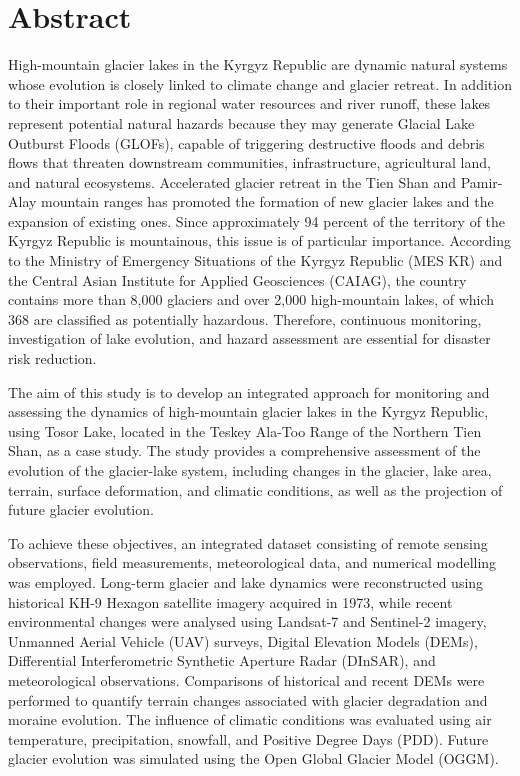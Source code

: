 \documentclass[12pt,a4paper]{report}
\begin{document}
\chapter*{Abstract}

High-mountain glacier lakes in the Kyrgyz Republic are dynamic natural systems whose evolution is closely linked to climate change and glacier retreat. In addition to their important role in regional water resources and river runoff, these lakes represent potential natural hazards because they may generate Glacial Lake Outburst Floods (GLOFs), capable of triggering destructive floods and debris flows that threaten downstream communities, infrastructure, agricultural land, and natural ecosystems. Accelerated glacier retreat in the Tien Shan and Pamir-Alay mountain ranges has promoted the formation of new glacier lakes and the expansion of existing ones. Since approximately 94 percent of the territory of the Kyrgyz Republic is mountainous, this issue is of particular importance. According to the Ministry of Emergency Situations of the Kyrgyz Republic (MES KR) and the Central Asian Institute for Applied Geosciences (CAIAG), the country contains more than 8,000 glaciers and over 2,000 high-mountain lakes, of which 368 are classified as potentially hazardous. Therefore, continuous monitoring, investigation of lake evolution, and hazard assessment are essential for disaster risk reduction.

The aim of this study is to develop an integrated approach for monitoring and assessing the dynamics of high-mountain glacier lakes in the Kyrgyz Republic, using Tosor Lake, located in the Teskey Ala-Too Range of the Northern Tien Shan, as a case study. The study provides a comprehensive assessment of the evolution of the glacier-lake system, including changes in the glacier, lake area, terrain, surface deformation, and climatic conditions, as well as the projection of future glacier evolution.

To achieve these objectives, an integrated dataset consisting of remote sensing observations, field measurements, meteorological data, and numerical modelling was employed. Long-term glacier and lake dynamics were reconstructed using historical KH-9 Hexagon satellite imagery acquired in 1973, while recent environmental changes were analysed using Landsat-7 and Sentinel-2 imagery, Unmanned Aerial Vehicle (UAV) surveys, Digital Elevation Models (DEMs), Differential Interferometric Synthetic Aperture Radar (DInSAR), and meteorological observations. Comparisons of historical and recent DEMs were performed to quantify terrain changes associated with glacier degradation and moraine evolution. The influence of climatic conditions was evaluated using air temperature, precipitation, snowfall, and Positive Degree Days (PDD). Future glacier evolution was simulated using the Open Global Glacier Model (OGGM).
\end{document}
